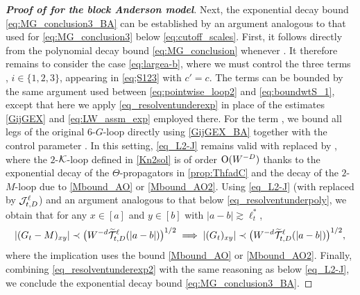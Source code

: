 \begin{proof}[\bf Proof of  for the block Anderson model]
Next, the exponential decay bound \eqref{eq:MG_conclusion3_BA} can be established by an argument analogous to that used for \eqref{eq:MG_conclusion3} below \eqref{eq:cutoff_scales}. 
First, it follows directly from the polynomial decay bound \eqref{eq:MG_conclusion} whenever . It therefore remains to consider the case \eqref{eq:largea-b}, where we must control the three terms , $i\in \{1,2,3\}$, appearing in \eqref{eq;S123} with $c'=c$. The terms  can be bounded by the same argument used between \eqref{eq:pointwise_loop2} and \eqref{eq:boundwtS_1}, except that here we apply \eqref{eq_resolventunderexp} in place of the estimates \eqref{GijGEX} and \eqref{eq:LW_assm_exp} employed there.
For the term , we bound all legs of the original $6$-$G$-loop directly using \eqref{GijGEX_BA} together with the control parameter . In this setting, \eqref{eq_L2-J} remains valid with  replaced by , where the $2$-$\cK$-loop  defined in \eqref{Kn2sol} is of order $\OO(W^{-D})$ thanks to the exponential decay of the $\Theta$-propagators in \eqref{prop:ThfadC} and the decay of the $2$-$M$-loop due to \eqref{Mbound_AO} or \eqref{Mbound_AO2}. Using \eqref{eq_L2-J} (with  replaced by $\cal J_{t,D}^{\ell}$) and an argument analogous to that below \eqref{eq_resolventunderpoly}, we obtain that for any $x\in [a]$ and $y\in [b]$ with $|a-b|\gtrsim\ell_t^*$,
\begin{equation}\label{eq_resolventunderexp2}
|(G_t-M)_{xy}| \prec \big(W^{-d} \wT_{t,D}^{\ell}(|a-b|) \big)^{1/2} \implies |(G_t)_{xy}| \prec \big(W^{-d} \wT_{t,D}^{\ell}(|a-b|) \big)^{1/2},
\end{equation}
where the implication uses the bound \eqref{Mbound_AO} or \eqref{Mbound_AO2}.
Finally, combining \eqref{eq_resolventunderexp2} with the same reasoning as below \eqref{eq_L2-J}, we conclude the exponential decay bound \eqref{eq:MG_conclusion3_BA}.
\end{proof}



